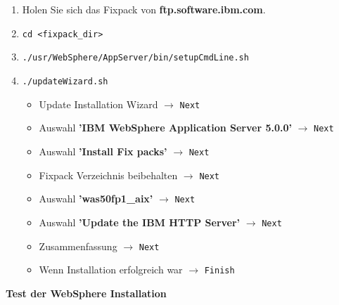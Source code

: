 \begin{enumerate}
\item Holen Sie sich das Fixpack von {\bf ftp.software.ibm.com}.
\item {\tt cd <fixpack\_dir>}
\item {\tt ./usr/WebSphere/AppServer/bin/setupCmdLine.sh}
\item {\tt ./updateWizard.sh}
\begin{itemize}
\item Update Installation Wizard $\rightarrow$ {\tt Next}
\item Auswahl {\bf 'IBM WebSphere Application Server 5.0.0'} $\rightarrow$ {\tt Next}
\item Auswahl {\bf 'Install Fix packs'} $\rightarrow$ {\tt Next}
\item Fixpack Verzeichnis beibehalten $\rightarrow$ {\tt Next}
\item Auswahl {\bf 'was50\/fp1\_aix'} $\rightarrow$ {\tt Next}
\item Auswahl {\bf 'Update the IBM HTTP Server'} $\rightarrow$ {\tt Next}
\item Zusammenfassung $\rightarrow$ {\tt Next}
\item Wenn Installation erfolgreich war $\rightarrow$ {\tt Finish}
\end{itemize}
\end{enumerate}
%
{\bf Test der WebSphere Installation}\\[1ex]
